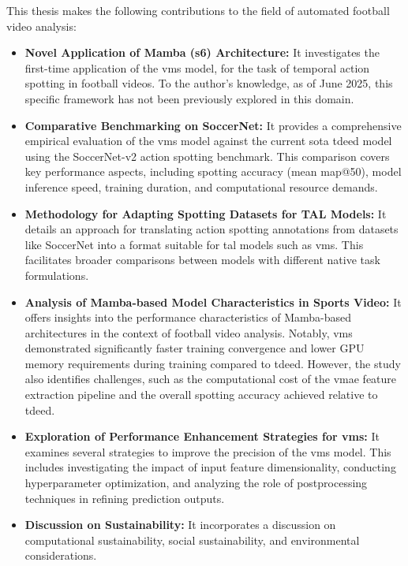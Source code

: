 This thesis makes the following contributions to the field of automated football video analysis:
\begin{itemize}
    \item \textbf{Novel Application of Mamba (\acrshort{s6}) Architecture:} It investigates the first-time application of the \acrfull{vms} model, for the task of temporal action spotting in football videos. To the author's knowledge, as of June 2025, this specific framework has not been previously explored in this domain.

    \item \textbf{Comparative Benchmarking on SoccerNet:} It provides a comprehensive empirical evaluation of the \acrshort{vms} model against the current \acrlong{sota} \acrshort{tdeed} model using the SoccerNet-v2 action spotting benchmark. This comparison covers key performance aspects, including spotting accuracy (mean \acrlong{map}@50), model inference speed, training duration, and computational resource demands.

    \item \textbf{Methodology for Adapting Spotting Datasets for TAL Models:} It details an approach for translating action spotting annotations from datasets like SoccerNet into a format suitable for \acrfull{tal} models such as \acrshort{vms}. This facilitates broader comparisons between models with different native task formulations.

    \item \textbf{Analysis of Mamba-based Model Characteristics in Sports Video:} It offers insights into the performance characteristics of Mamba-based architectures in the context of football video analysis. Notably, \acrshort{vms} demonstrated significantly faster training convergence and lower GPU memory requirements during training compared to \acrshort{tdeed}. However, the study also identifies challenges, such as the computational cost of the \acrshort{vmae} feature extraction pipeline and the overall spotting accuracy achieved relative to \acrshort{tdeed}.

    \item \textbf{Exploration of Performance Enhancement Strategies for \acrshort{vms}:} It examines several strategies to improve the precision of the \acrshort{vms} model. This includes investigating the impact of input feature dimensionality, conducting hyperparameter optimization, and analyzing the role of postprocessing techniques in refining prediction outputs.

    \item \textbf{Discussion on Sustainability:} It incorporates a discussion on computational sustainability, social sustainability, and environmental considerations.
    
\end{itemize}

